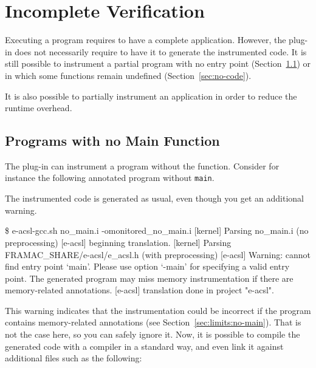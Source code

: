 \section{Incomplete Verification} %
\label{sec:incomplete}

Executing a \C program requires to have a complete application. However, the
\eacsl plug-in does not necessarily require to have it to generate the
instrumented code. It is still possible to instrument a partial program with no
entry point (Section~\ref{sec:no-main}) or in which some functions remain
undefined (Section~\ref{sec:no-code}).

It is also possible to partially instrument an application in order to reduce
the runtime overhead.


\subsection{Programs with no Main Function}
\label{sec:no-main}

The \eacsl plug-in can instrument a program without the  function.
Consider for instance the following annotated program without \texttt{main}.


The instrumented code is generated as usual, even though you get an additional
warning.
\begin{logs}
\$ e-acsl-gcc.sh no_main.i -omonitored_no_main.i
[kernel] Parsing no_main.i (no preprocessing)
[e-acsl] beginning translation.
[kernel] Parsing FRAMAC_SHARE/e-acsl/e_acsl.h (with preprocessing)
[e-acsl] Warning: cannot find entry point `main'.
  Please use option `-main' for specifying a valid entry point.
  The generated program may miss memory instrumentation
  if there are memory-related annotations.
[e-acsl] translation done in project "e-acsl".
\end{logs}

This warning indicates that the instrumentation could be incorrect if the
program contains memory-related annotations (see
Section~\ref{sec:limits:no-main}). That is not the case here, so you can
safely ignore it. Now, it is possible to compile the generated code with a \C
compiler in a standard way, and even link it against additional files such as
the following:

